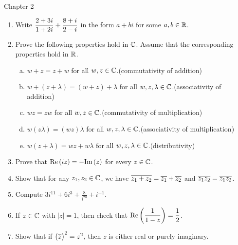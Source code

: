 \documentclass[11pt,fleqn,dvipsnames,usenames]{article}
\begin{document}
{\huge Chapter 2}
\vsp

\begin{enumerate}
\item Write $\displaystyle{\frac{2 + 3i}{1 + 2i} + \frac{8+i}{2-i}}$ in the form $a+bi$ for some $a,b\in\mathbb{R}$.
\item Prove the following properties hold in $\mathbb{C}$.  Assume that the corresponding properties hold in $\mathbb{R}$.
\begin{enumerate}[(a)]
\item $w + z = z + w$ for all $w,z\in\mathbb{C}$.\hfill (commutativity of addition)
\item $w + (z + \lambda) = (w + z) + \lambda$ for all $w,z,\lambda\in\mathbb{C}$.\hfill (associativity of addition)
\item $wz = zw$ for all $w,z\in\mathbb{C}$.\hfill (commutativity of multiplication)
\item $w(z\lambda) = (wz)\lambda$ for all $w,z,\lambda\in\mathbb{C}$.\hfill (associativity of multiplication)
\item $w(z + \lambda) = wz + w\lambda$ for all $w,z,\lambda\in\mathbb{C}$.\hfill (distributivity)
\end{enumerate}
\item Prove that $\text{Re}\left(iz\right) = -\text{Im}\left(z\right)$ for every $z\in\mathbb{C}$.
\item Show that for any $z_{1},z_{2}\in\mathbb{C}$, we have $\overline{z_{1} + z_{2}} = \overline{z_{1}} + \overline{z_{2}}$ and $\overline{z_{1}z_{2}} = \overline{z_{1}}\overline{z_{2}}$.
\item Compute $3i^{11} + 6i^{3} + \frac{8}{i^{20}} + i^{-1}$.
\item If $z\in\mathbb{C}$ with $|z| = 1$, then check that $\text{Re}\left(\dfrac{1}{1-z}\right) = \dfrac{1}{2}$.
\item Show that if $\big(\overline{z}\big)^2 = z^2$, then $z$ is either real or purely imaginary.

\end{enumerate}
\end{document}
